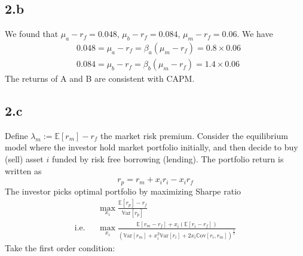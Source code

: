 \documentclass[10 pt]{hwtemplate} %
\begin{document}
\subsection*{2.b} We found that $\mu_a - r_f=0.048$, $\mu_b - r_f=0.084$, $\mu_m - r_f=0.06$. We have
\begin{equation}
  \begin{split}
    &0.048=\mu_a - r_f = \beta_a (\mu_m - r_f) =0.8\times 0.06\\
    &0.084=\mu_b - r_f = \beta_b (\mu_m - r_f) =1.4\times 0.06
  \end{split}
\end{equation}
The returns of A and B are consistent with CAPM.

\subsection*{2.c} Define $\lambda_m := \mathbb{E}\left[r_m\right] - r_f$ the market risk premium. Consider the equilibrium model where the investor hold market portfolio initially, and then decide to buy (sell) asset $i$ funded by risk free borrowing (lending). The portfolio return is written as
$$
r_p = r_m + x_ir_i - x_ir_f
$$
The investor picks optimal portfolio by maximizing Sharpe ratio
\begin{equation}
  \begin{split}
      &\max\limits_{x_i} \frac{\mathbb{E}\left[r_p\right] - r_f}{\mathrm{\mathbb{V}ar}\left[r_p\right]} \\
      \text{i.e.}~~~&\max\limits_{x_i} \frac{\mathbb{E}\left[r_m-r_f\right] + x_i(\mathbb{E}\left[r_i-r_f\right] )}{(\mathrm{\mathbb{V}ar}\left[r_m\right] + x_i^2\mathrm{\mathbb{V}ar}\left[r_i\right] + 2x_i \mathrm{\mathbb{C}ov}\left[r_i, r_m\right])^{\frac{1}{2}}}
    \end{split}  
\end{equation}
Take the first order condition:
\end{document}
